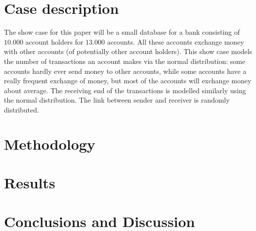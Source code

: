\documentclass{sig-alternate-br}
\begin{document}
\section{Case description}
\label{sec:case}
The show case for this paper will be a small database for a bank consisting of $10.000$ account holders for $13.000$ accounts. All these accounts exchange money with other accounts (of potentially other account holders). This show case models the number of transactions an account makes via the normal distribution: some accounts hardly ever send money to other accounts, while some accounts have a really frequent exchange of money, but most of the accounts will exchange money about average. The receiving end of the transactions is modelled similarly using the normal distribution. The link between sender and receiver is randomly distributed.

\section{Methodology}
\label{sec:methodology}

\section{Results}
\label{sec:results}

\section{Conclusions and Discussion}
\label{sec:conclusions}


%


\balancecolumns

\onecolumn
\end{document}
